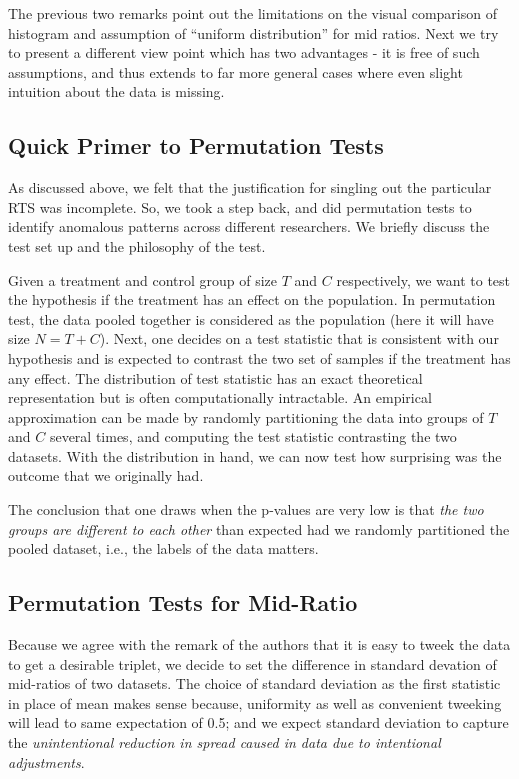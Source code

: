\documentclass{article}
\begin{document}
The previous two remarks point out the limitations on the visual
comparison of histogram and assumption of ``uniform distribution'' for
mid ratios. Next we try to present a different view point which has two advantages - it is free of such assumptions, and thus extends to far more general cases where even slight intuition about the data is missing.



    \subsection{Quick Primer to Permutation
Tests}\label{quick-primer-to-permutation-tests}

As discussed above, we felt that the justification for
singling out the particular RTS was incomplete. So, we took a step back,
and did permutation tests to identify anomalous patterns across different
researchers. We briefly discuss the test set up and the philosophy of the test.

Given a treatment and control group of size \(T\) and \(C\)
respectively, we want to test the hypothesis if the treatment has an
effect on the population. In permutation test, the data pooled together
is considered as the population (here it will have size \(N = T+C\)).
Next, one decides on a test statistic that is consistent with our
hypothesis and is expected to contrast the two set of samples if the
treatment has any effect. The distribution of test statistic has an
exact theoretical representation but is often computationally
intractable. An empirical approximation can be made by randomly
partitioning the data into groups of \(T\) and \(C\) several times, and
computing the test statistic contrasting the two datasets. With the
distribution in hand, we can now test how surprising was the outcome
that we originally had.

The conclusion that one draws when the p-values are very low is that \textit{the
two groups are different to each other} than expected had we randomly partitioned
the pooled dataset, i.e., the labels of the data matters.


    \subsection{Permutation Tests for
Mid-Ratio}\label{permutation-tests-for-mid-ratio}

Because we agree with the remark of the authors that it is easy to tweek
the data to get a desirable triplet, we decide to set the difference in
standard devation of mid-ratios of two datasets. The choice of standard deviation as the first statistic in place of mean
makes sense because, uniformity as well as convenient tweeking will lead
to same expectation of 0.5; and we expect standard deviation to capture
the \textit{unintentional reduction in spread caused in data due to
intentional adjustments}.
\end{document}
